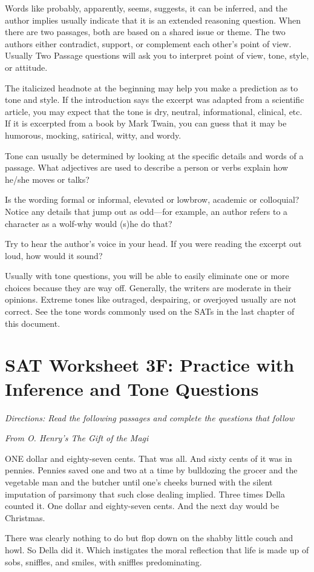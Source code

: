 \bigskip
Words like probably, apparently, seems, suggests, it can be inferred, and the author implies usually indicate that it is an extended reasoning question. When there are two passages, both are based on a shared issue or theme.  The two authors either contradict, support, or complement each other's point of view. Usually Two Passage questions will ask you to interpret point of view, tone, style, or attitude.

\bigskip
The italicized headnote at the beginning may help you make a prediction as to tone and style.  If the introduction says the excerpt was adapted from a scientific article, you may expect that the tone is dry, neutral, informational, clinical, etc.  If it is excerpted from a book by Mark Twain, you can guess that it may be humorous, mocking, satirical, witty, and wordy.

\bigskip
Tone can usually be determined by looking at the specific details and words of a passage. What adjectives are used to describe a person or verbs explain how he/she moves or talks?

\bigskip
Is the wording formal or informal, elevated or lowbrow, academic or colloquial?  Notice any details that jump out as odd—for example, an author refers to a character as a wolf-why would (s)he do that?

\bigskip
Try to hear the author's voice in your head.  If you were reading the excerpt out loud, how would it sound? 

\bigskip
Usually with tone questions, you will be able to easily eliminate one or more choices because they are way off.  Generally, the writers are moderate in their opinions.  Extreme tones like outraged, despairing, or overjoyed usually are not correct. See the tone words commonly used on the SATs in the last chapter of this document.

\newpage
\section[Inference and Tone Practice]{SAT Worksheet 3F: Practice with Inference and Tone Questions}
\textit{Directions: Read the following passages and complete the questions that follow}

\bigskip
\textit{From O. Henry's The Gift of the Magi}

\bigskip
\begin{linenumbers*}
\modulolinenumbers[5]
\indent ONE dollar and eighty-seven cents. That was all. And sixty cents of it was in pennies. Pennies saved one and two at a time by bulldozing the grocer and the vegetable man and the butcher until one's cheeks burned with the silent imputation of parsimony that such close dealing implied. Three times Della counted it. One dollar and eighty-seven cents. And the next day would be Christmas.

\indent There was clearly nothing to do but flop down on the shabby little couch and howl. So Della did it. Which instigates the moral reflection that life is made up of sobs, sniffles, and smiles, with sniffles predominating.
\end{linenumbers*}

